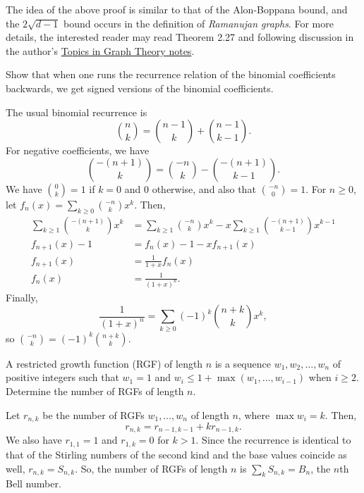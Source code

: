 	The idea of the above proof is similar to that of the Alon-Boppana bound, and the $2\sqrt{d-1}$ bound occurs in the definition of \emph{Ramanujan graphs}. For more details, the interested reader may read Theorem 2.27 and following discussion in the author's \href{https://amitrajaraman.github.io/notes/ma-5109/main.pdf}{Topics in Graph Theory notes}.

	\begin{problem}
		\label{binomial recurrence backwards}
		Show that when one runs the recurrence relation of the binomial coefficients backwards, we get signed versions of the binomial coefficients.
	\end{problem}
	\begin{solution*}
		The usual binomial recurrence is
		\[ \binom{n}{k} = \binom{n-1}{k} + \binom{n-1}{k-1}. \]
		For negative coefficients, we have
		\[ \binom{-(n+1)}{k} = \binom{-n}{k} - \binom{-(n+1)}{k-1}. \]
		We have $\binom{0}{k} = 1$ if $k = 0$ and $0$ otherwise, and also that $\binom{-n}{0} = 1$.
		For $n\ge 0$, let $f_n(x) = \sum_{k \ge 0} \binom{-n}{k} x^k$. Then,
		\begin{align*}
			\sum_{k \ge 1} \binom{-(n+1)}{k} x^k &= \sum_{k \ge 1} \binom{-n}{k} x^k - x \sum_{k \ge 1} \binom{-(n+1)}{k-1} x^{k-1} \\
			f_{n+1}(x)-1 &= f_n(x)-1 - xf_{n+1}(x) \\
			f_{n+1}(x) &= \frac{1}{1+x} f_n(x) \\
			f_{n}(x) &= \frac{1}{(1+x)^n}.
		\end{align*}
		Finally,
		\[ \frac{1}{(1+x)^n} = \sum_{k \ge 0} (-1)^k \binom{n+k}{k} x^k, \]
		so $\binom{-n}{k} = (-1)^k \binom{n+k}{k}$.
	\end{solution*}

	\begin{problem}
		A restricted growth function (RGF) of length $n$ is a sequence $w_1,w_2,\ldots,w_n$ of positive integers such that $w_1 = 1$ and $w_i \le 1 + \max(w_1,\ldots,w_{i-1})$ when $i \ge 2$. Determine the number of RGFs of length $n$.
	\end{problem}
	\begin{solution*}
		Let $r_{n,k}$ be the number of RGFs $w_1,\ldots,w_n$ of length $n$, where $\max w_i = k$. Then,
		\[ r_{n,k} = r_{n-1,k-1} + k r_{n-1,k}. \]
		We also have $r_{1,1} = 1$ and $r_{1,k} = 0$ for $k > 1$. Since the recurrence is identical to that of the Stirling numbers of the second kind and the base values coincide as well, $r_{n,k} = S_{n,k}$. So, the number of RGFs of length $n$ is $\sum_k S_{n,k} = B_n$, the $n$th Bell number.
	\end{solution*}

